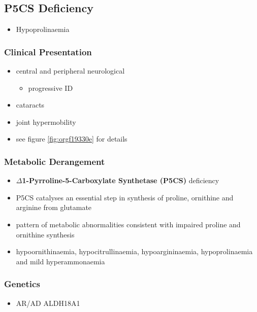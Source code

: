 \documentclass[12pt]{scrartcl}
\begin{document}
\begin{center}
\begin{center}
\subsection{P5CS  Deficiency}
\label{sec:org3aef687}
\begin{itemize}
\item Hypoprolinaemia
\end{itemize}
\subsubsection{Clinical Presentation}
\label{sec:orgb894793}
\begin{itemize}
\item central and peripheral neurological
\begin{itemize}
\item progressive ID
\end{itemize}
\item cataracts
\item joint hypermobility
\item see figure \ref{fig:orgf19330e} for details
\end{itemize}

\subsubsection{Metabolic Derangement}
\label{sec:org4a627ec}
\begin{itemize}
\item \textbf{\(\Delta\)1-Pyrroline-5-Carboxylate Synthetase (P5CS)} deficiency
\item P5CS catalyses an essential step in synthesis of proline, ornithine
and arginine from glutamate
\end{itemize}


\begin{itemize}
\item pattern of metabolic abnormalities consistent with impaired proline
and ornithine synthesis
\item hypoornithinaemia, hypocitrullinaemia, hypoargininaemia,
hypoprolinaemia and mild hyperammonaemia
\end{itemize}

\subsubsection{Genetics}
\label{sec:orgcb07c45}
\begin{itemize}
\item AR/AD ALDH18A1
\end{itemize}


\end{center}
\end{center}
\end{document}

